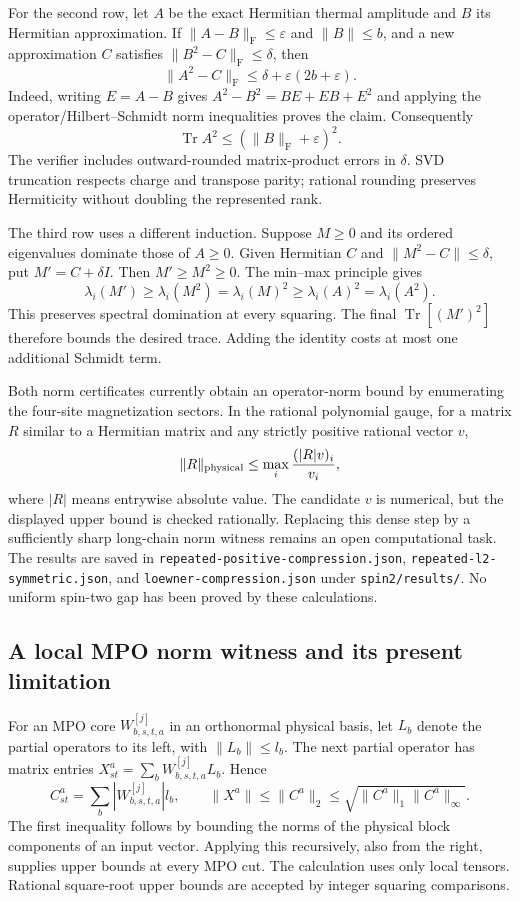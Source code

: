 \documentclass[11pt]{article}
\newcommand{\Tr}{\operatorname{Tr}}
\begin{document}
For the second row, let $A$ be the exact Hermitian thermal amplitude and
$B$ its Hermitian approximation. If
$\|A-B\|_{\mathrm F}\le\varepsilon$ and $\|B\|\le b$, and a new
approximation $C$ satisfies $\|B^2-C\|_{\mathrm F}\le\delta$, then
\[
 \|A^2-C\|_{\mathrm F}\le
 \delta+\varepsilon(2b+\varepsilon).
\]
Indeed, writing $E=A-B$ gives
$A^2-B^2=BE+EB+E^2$ and applying the operator/Hilbert--Schmidt norm
inequalities proves the claim. Consequently
\[
 \Tr A^2\le(\|B\|_{\mathrm F}+\varepsilon)^2.
\]
The verifier includes outward-rounded matrix-product errors in $\delta$.
SVD truncation respects charge and transpose parity; rational rounding
preserves Hermiticity without doubling the represented rank.

The third row uses a different induction. Suppose $M\ge0$ and its ordered
eigenvalues dominate those of $A\ge0$. Given Hermitian $C$ and
$\|M^2-C\|\le\delta$, put $M'=C+\delta I$. Then
$M'\ge M^2\ge0$. The min--max principle gives
\[
 \lambda_i(M')\ge\lambda_i(M^2)=\lambda_i(M)^2
 \ge\lambda_i(A)^2=\lambda_i(A^2).
\]
This preserves spectral domination at every squaring. The final
$\Tr[(M')^2]$ therefore bounds the desired trace. Adding the identity costs
at most one additional Schmidt term.

Both norm certificates currently obtain an operator-norm bound by enumerating
the four-site magnetization sectors. In the rational polynomial gauge,
for a matrix $R$ similar to a Hermitian matrix and any strictly positive
rational vector $v$,
\[
 \|R\|_{\rm physical}\le
 \max_i\frac{(|R|v)_i}{v_i},
\]
where $|R|$ means entrywise absolute value. The candidate $v$ is numerical,
but the displayed upper bound is checked rationally. Replacing this dense
step by a sufficiently sharp long-chain norm witness remains an open computational
task. The results are saved in
\texttt{repeated-positive-compression.json},
\texttt{repeated-l2-symmetric.json}, and
\texttt{loewner-compression.json} under \texttt{spin2/results/}.
No uniform spin-two gap has been proved by these calculations.

\subsection{A local MPO norm witness and its present limitation}
For an MPO core $W^{[j]}_{b,s,t,a}$ in an orthonormal physical basis, let
$L_b$ denote the partial operators to its left, with $\|L_b\|\le l_b$.
The next partial operator has matrix entries
$X^a_{st}=\sum_bW^{[j]}_{b,s,t,a}L_b$. Hence
\[
 C^a_{st}=\sum_b|W^{[j]}_{b,s,t,a}|l_b,
 \qquad
 \|X^a\|\le\|C^a\|_2
 \le\sqrt{\|C^a\|_1\|C^a\|_\infty}.
\]
The first inequality follows by bounding the norms of the physical block
components of an input vector. Applying this recursively, also from the
right, supplies upper bounds at every MPO cut. The calculation uses only
local tensors. Rational square-root upper bounds are accepted by integer
squaring comparisons.
\end{document}
